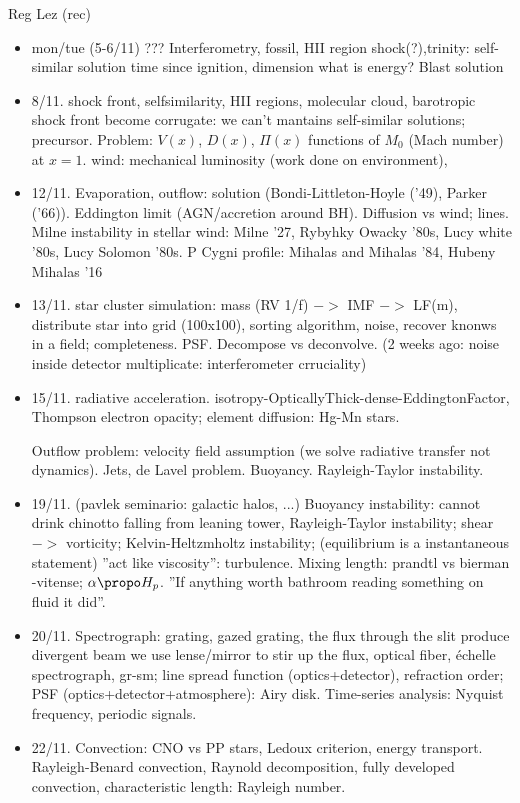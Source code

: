 \begin{frame}[allowframebreaks]{Reg Lez (rec)}
\begin{itemize}
\item mon/tue (5-6/11) ???
Interferometry, fossil, HII region shock(?),trinity: self-similar solution time since ignition, dimension what is energy?
Blast solution

\item 8/11. shock front, selfsimilarity, HII regions, molecular cloud, barotropic shock front become corrugate: we can't mantains self-similar solutions; precursor. Problem: $V(x)$, $D(x)$, $\Pi(x)$ functions of $M_0$ (Mach number) at $x=1$.
wind: mechanical luminosity (work done on environment),

\item 12/11. Evaporation, outflow: solution (Bondi-Littleton-Hoyle ('49), Parker ('66)). Eddington limit (AGN/accretion around BH). Diffusion vs wind; lines. Milne instability in stellar wind: Milne '27, Rybyhky Owacky '80s, Lucy white '80s, Lucy Solomon '80s. P Cygni profile: Mihalas and Mihalas '84, Hubeny Mihalas '16

\item 13/11. star cluster simulation: mass (RV 1/f) $->$ IMF $->$ LF(m), distribute star into grid (100x100), sorting algorithm, noise, recover knonws in a field; completeness. PSF. Decompose vs deconvolve. (2 weeks ago: noise inside detector multiplicate: interferometer crruciality)

\item 15/11. radiative acceleration. isotropy-OpticallyThick-dense-EddingtonFactor, Thompson electron opacity; element diffusion: Hg-Mn stars.

Outflow problem: velocity field assumption (we solve radiative transfer not dynamics). 
Jets, de Lavel problem. Buoyancy. Rayleigh-Taylor instability.

\item 19/11. (pavlek seminario: galactic halos, ...) Buoyancy instability: cannot drink chinotto falling from leaning tower, Rayleigh-Taylor instability; shear $->$ vorticity; Kelvin-Heltzmholtz instability; (equilibrium is a instantaneous statement) ''act like viscosity'': turbulence. Mixing length: prandtl vs bierman -vitense; $\alpha\propo H_p$. ''If anything worth bathroom reading something on fluid it did''.

\item 20/11. Spectrograph: grating, gazed grating, the flux through the slit produce divergent beam \so{} we use lense/mirror to stir up the flux, optical fiber, \'echelle spectrograph, gr-sm; line spread function (optics+detector), refraction order; PSF (optics+detector+atmosphere): Airy disk. Time-series analysis: Nyquist frequency, periodic signals.

\item 22/11. Convection: CNO vs PP stars, Ledoux criterion, energy transport. Rayleigh-Benard convection, Raynold decomposition, fully developed convection, characteristic length: Rayleigh number.

\end{itemize}

\end{frame}